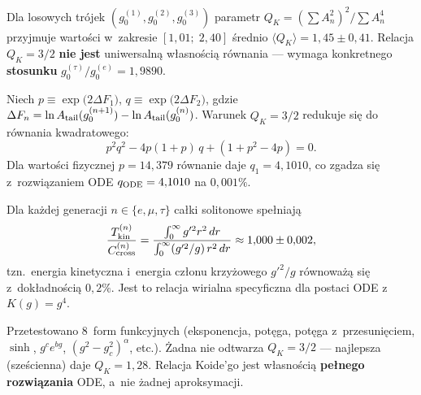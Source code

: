 \begin{proposition}%
\label{prop:T-koide-not-universal}
Dla losowych tr\'ojek $(g_0^{(1)}, g_0^{(2)}, g_0^{(3)})$
parametr $Q_K = (\sum A_n^2)^2 / \sum A_n^4$ przyjmuje warto\'sci
w~zakresie $[1{,}01;\; 2{,}40]$ \'srednio $\langle Q_K\rangle = 1{,}45 \pm 0{,}41$.
Relacja $Q_K = 3/2$ \textbf{nie jest} uniwersaln\k{a} w\l{}asno\'sci\k{a}
r\'ownania --- wymaga konkretnego \textbf{stosunku}
$g_0^{(\tau)}/g_0^{(e)} = 1{,}9890$.
\end{proposition}

\begin{proposition}%
\label{prop:T-koide-pq}
Niech $p \equiv \exp\bigl(2\Delta F_1\bigr)$,
$q \equiv \exp\bigl(2\Delta F_2\bigr)$,
gdzie $\Delta F_n = \ln A_{\rm tail}(g_0^{(n+1)}) - \ln A_{\rm tail}(g_0^{(n)})$.
Warunek $Q_K = 3/2$ redukuje si\k{e} do r\'ownania kwadratowego:
\begin{equation}\label{eq:T-koide-pq}
  p^2 q^2 - 4p(1+p)\,q + (1 + p^2 - 4p) = 0.
\end{equation}
Dla warto\'sci fizycznej $p = 14{,}379$ r\'ownanie daje
$q_1 = 4{,}1010$, co zgadza si\k{e} z~rozwi\k{a}zaniem ODE
$q_{\rm ODE} = 4{,}1010$ na $0{,}001\%$.
\end{proposition}

\begin{remark}%
\label{rem:T-virial-cross}
Dla ka\.zdej generacji $n \in \{e, \mu, \tau\}$ ca\l{}ki solitonowe
spe\l{}niaj\k{a}
\[
  \frac{T_{\rm kin}^{(n)}}{C_{\rm cross}^{(n)}} =
  \frac{\int_0^\infty g'^2 r^2\,dr}{\int_0^\infty (g'^2/g)\,r^2\,dr}
  \approx 1{,}000 \pm 0{,}002,
\]
tzn.\ energia kinetyczna i~energia cz\l{}onu krzy\.zowego $g'^2/g$
r\'ownowa\.z\k{a} si\k{e} z~dok\l{}adno\'sci\k{a} $0{,}2\%$.
Jest to relacja wirialna specyficzna dla postaci ODE z~$K(g) = g^4$.
\end{remark}

\begin{remark}%
\label{rem:T-no-simple-form}
Przetestowano 8~form funkcyjnych
(eksponencja, pot\k{e}ga, pot\k{e}ga z~przesuni\k{e}ciem, $\sinh$,
$g^c e^{bg}$, $(g^2 - g_c^2)^\alpha$, etc.).
\.Zadna nie odtwarza $Q_K = 3/2$ ---
najlepsza (sze\'scienna) daje $Q_K = 1{,}28$.
Relacja Koide'go jest w\l{}asno\'sci\k{a}
\textbf{pe\l{}nego rozwi\k{a}zania} ODE, a~nie \.zadnej aproksymacji.
\end{remark}

